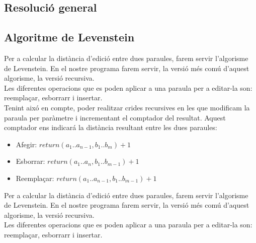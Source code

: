 \documentclass[conference]{IEEEtran}
\begin{document}
    \subsection{Resolució general}


    \subsection{Algoritme de Levenstein}
    Per a calcular la distància d'edició entre dues paraules, farem servir l'algorisme de Levenstein. En el nostre programa farem servir, la versió més comú d'aquest algorisme, la versió recursiva.\\

    Les diferentes operacions que es poden aplicar a una paraula per a editar-la son: reemplaçar, esborrarr i insertar.\\
    Tenint aixó en compte, poder realitzar crides recursives en les que modificam la paraula per paràmetre i incrementant el comptador del resultat. Aquest comptador ens indicará la distància resultant entre les dues paraules:
    \begin{itemize}
        \item Afegir: $return  (a_1..a_{n-1}, b_1..b_m) + 1$
        \item Esborrar: $return (a_1..a_n, b_1..b_{m-1}) + 1$
        \item Reemplaçar: $return (a_1..a_{n-1}, b_1..b_{m-1}) + 1$
    \end{itemize}

    Per a calcular la distància d'edició entre dues paraules, farem servir l'algorisme de Levenstein. En el nostre programa farem servir, la versió més comú d'aquest algorisme, la versió recursiva.\\
    
    Les diferentes operacions que es poden aplicar a una paraula per a editar-la son: reemplaçar, esborrarr i insertar.\\
\end{document}
